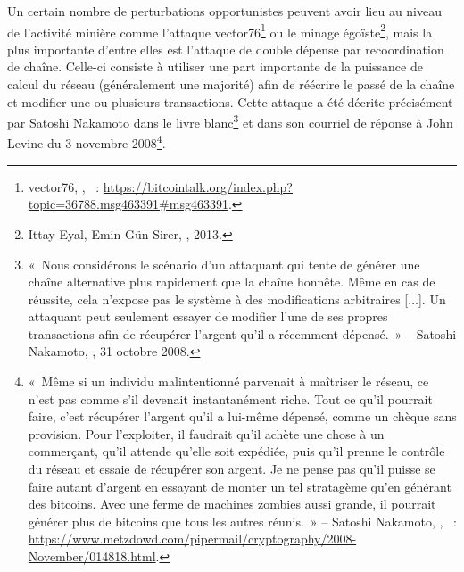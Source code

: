 
Un certain nombre de perturbations opportunistes peuvent avoir lieu au niveau de l'activité minière comme l'attaque vector76\footnote{vector76, , ~: \url{https://bitcointalk.org/index.php?topic=36788.msg463391\#msg463391}.} ou le minage égoïste\footnote{Ittay Eyal, Emin Gün Sirer, , 2013.}, mais la plus importante d'entre elles est l'attaque de double dépense par recoordination de chaîne. Celle-ci consiste à utiliser une part importante de la puissance de calcul du réseau (généralement une majorité) afin de réécrire le passé de la chaîne et modifier une ou plusieurs transactions. Cette attaque a été décrite précisément par Satoshi Nakamoto dans le livre blanc\footnote{«~Nous considérons le scénario d'un attaquant qui tente de générer une chaîne alternative plus rapidement que la chaîne honnête. Même en cas de réussite, cela n'expose pas le système à des modifications arbitraires [...]. Un attaquant peut seulement essayer de modifier l'une de ses propres transactions afin de récupérer l'argent qu'il a récemment dépensé.~» -- Satoshi Nakamoto, , 31 octobre 2008.} et dans son courriel de réponse à John Levine du 3 novembre 2008\footnote{«~Même si un individu malintentionné parvenait à maîtriser le réseau, ce n'est pas comme s'il devenait instantanément riche. Tout ce qu'il pourrait faire, c'est récupérer l'argent qu'il a lui-même dépensé, comme un chèque sans provision. Pour l'exploiter, il faudrait qu'il achète une chose à un commerçant, qu'il attende qu'elle soit expédiée, puis qu'il prenne le contrôle du réseau et essaie de récupérer son argent. Je ne pense pas qu'il puisse se faire autant d'argent en essayant de monter un tel stratagème qu'en générant des bitcoins. Avec une ferme de machines zombies aussi grande, il pourrait générer plus de bitcoins que tous les autres réunis.~» -- Satoshi Nakamoto, , ~: \url{https://www.metzdowd.com/pipermail/cryptography/2008-November/014818.html}.}. %

